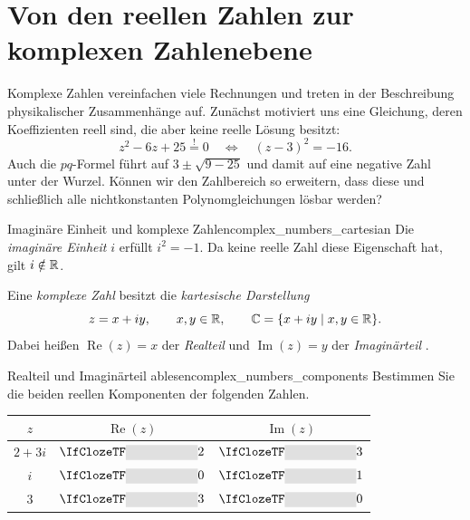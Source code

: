 \section{Von den reellen Zahlen zur komplexen Zahlenebene}
\label{sec:complex_numbers_cartesian_form}

Komplexe Zahlen vereinfachen viele Rechnungen und treten in der Beschreibung
physikalischer Zusammenhänge auf. Zunächst motiviert uns eine Gleichung,
deren Koeffizienten reell sind, die aber keine reelle Lösung besitzt:
\[
  z^2-6z+25\overset{!}{=}0
  \quad\Longleftrightarrow\quad (z-3)^2=-16.
\]
Auch die $pq$-Formel führt auf $3\pm\sqrt{9-25}$ und damit auf eine negative
Zahl unter der Wurzel. Können wir den Zahlbereich so erweitern, dass diese
und schließlich alle nichtkonstanten Polynomgleichungen lösbar werden?

\par\noindent\begin{minipage}{\linewidth}
\begin{DefinitionBox}{Imaginäre Einheit und komplexe Zahlen}{complex_numbers_cartesian}
  Die \emph{imaginäre Einheit}  $i$ erfüllt
  $i^2=-1$. Da keine reelle Zahl diese Eigenschaft hat, gilt $i\notin\mathbb{R}$.

  Eine \emph{komplexe Zahl}  besitzt die
  \emph{kartesische Darstellung} 
  \[
    z=x+iy,\qquad x,y\in\mathbb{R},\qquad
    \mathbb{C}=\{x+iy\mid x,y\in\mathbb{R}\}.
  \]
  Dabei heißen $\operatorname{Re}(z)=x$ der \emph{Realteil}
   und $\operatorname{Im}(z)=y$ der
  \emph{Imaginärteil} .
\end{DefinitionBox}
\vspace{-0.5\baselineskip}
\begin{ExampleBox}{Realteil und Imaginärteil ablesen}{complex_numbers_components}
  Bestimmen Sie die beiden reellen Komponenten der folgenden Zahlen.
  \begin{center}
    \renewcommand{\arraystretch}{1.3}
    \begin{tabular}{@{}c@{\qquad}c@{\qquad}c@{}}
      $z$ & $\operatorname{Re}(z)$ & $\operatorname{Im}(z)$\\\midrule
      $2+3i$ & $\Cloze{2cm}{2}$ & $\Cloze{2cm}{3}$\\
      $i$ & $\Cloze{2cm}{0}$ & $\Cloze{2cm}{1}$\\
      $3$ & $\Cloze{2cm}{3}$ & $\Cloze{2cm}{0}$
    \end{tabular}
  \end{center}
\end{ExampleBox}
\end{minipage}\par


